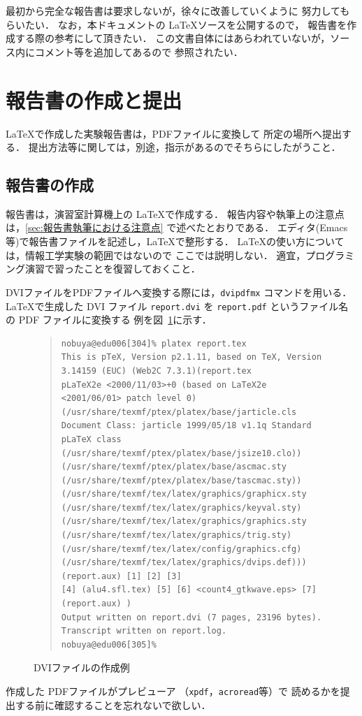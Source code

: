 \documentclass{jarticle}[11pt]
\begin{document}
最初から完全な報告書は要求しないが，徐々に改善していくように
努力してもらいたい．
なお，本ドキュメントの \LaTeX ソースを公開するので，
報告書を作成する際の参考にして頂きたい．
この文書自体にはあらわれていないが，ソース内にコメント等を追加してあるので
参照されたい．


\section{報告書の作成と提出}
\label{sec:報告書の作成と提出}
\LaTeX で作成した実験報告書は，PDFファイルに変換して
所定の場所へ提出する．
提出方法等に関しては，別途，指示があるのでそちらにしたがうこと．

\subsection{報告書の作成}
報告書は，演習室計算機上の \LaTeX で作成する．
報告内容や執筆上の注意点は，\ref{sec:報告書執筆における注意点}
で述べたとおりである．
エディタ(Emacs等)で報告書ファイルを記述し，\LaTeX で整形する．
\LaTeX の使い方については，情報工学実験の範囲ではないので
ここでは説明しない．
適宜，プログラミング演習で習ったことを復習しておくこと．

DVIファイルをPDFファイルへ変換する際には，\verb|dvipdfmx| コマンドを用いる．
\LaTeX で生成した DVI ファイル \verb|report.dvi| を
\verb|report.pdf| というファイル名の PDF ファイルに変換する
例を図~\ref{fig:DVIファイルの作成例}に示す．
\begin{figure}[htb]
{\small
\begin{quote}
\begin{verbatim}
nobuya@edu006[304]% platex report.tex
This is pTeX, Version p2.1.11, based on TeX, Version 3.14159 (EUC) (Web2C 7.3.1)(report.tex
pLaTeX2e <2000/11/03>+0 (based on LaTeX2e <2001/06/01> patch level 0)
(/usr/share/texmf/ptex/platex/base/jarticle.cls
Document Class: jarticle 1999/05/18 v1.1q Standard pLaTeX class
(/usr/share/texmf/ptex/platex/base/jsize10.clo))
(/usr/share/texmf/ptex/platex/base/ascmac.sty
(/usr/share/texmf/ptex/platex/base/tascmac.sty))
(/usr/share/texmf/tex/latex/graphics/graphicx.sty
(/usr/share/texmf/tex/latex/graphics/keyval.sty)
(/usr/share/texmf/tex/latex/graphics/graphics.sty
(/usr/share/texmf/tex/latex/graphics/trig.sty)
(/usr/share/texmf/tex/latex/config/graphics.cfg)
(/usr/share/texmf/tex/latex/graphics/dvips.def))) (report.aux) [1] [2] [3]
[4] (alu4.sfl.tex) [5] [6] <count4_gtkwave.eps> [7] (report.aux) )
Output written on report.dvi (7 pages, 23196 bytes).
Transcript written on report.log.
nobuya@edu006[305]%
\end{verbatim}
\end{quote}
} %
\caption{DVIファイルの作成例}
\label{fig:DVIファイルの作成例}
\end{figure}
作成した PDFファイルがプレビューア （\verb|xpdf|，\verb|acroread|等）で
読めるかを提出する前に確認することを忘れないで欲しい．
\end{document}

